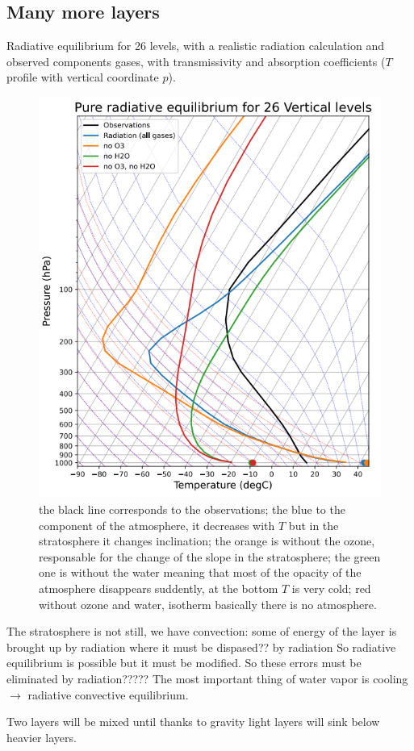 \subsection{Many more layers}
Radiative equilibrium for 26 levels, with a realistic radiation calculation and observed components gases, with transmissivity and absorption coefficients ($T$ profile with vertical coordinate $p$).
\begin{figure}[h!]
	\centering
	\includegraphics[width=0.5\linewidth]{uploads/Screenshot 2024-11-20 130113.png}
	\caption{the black line corresponds to the observations; the blue to the component of the atmosphere, it decreases with $T$ but in the stratosphere it changes inclination; the orange is without the ozone, responsable for the change of the slope in the stratosphere; the green one is without the water meaning that most of the opacity of the atmosphere disappears suddently, at the bottom $T$ is very cold; red without ozone and water, isotherm basically there is no atmosphere.}
	\label{fig:enter-label}
\end{figure}
The stratosphere is not still, we have convection: some of energy of the layer is brought up by radiation where it must be dispased?? by radiation So radiative equilibrium is possible but it must be modified. So these errors must be eliminated by radiation????? %
The most important thing of water vapor is cooling $\rightarrow$ radiative convective equilibrium.



Two layers will be mixed until thanks to gravity light layers will sink below heavier layers.

